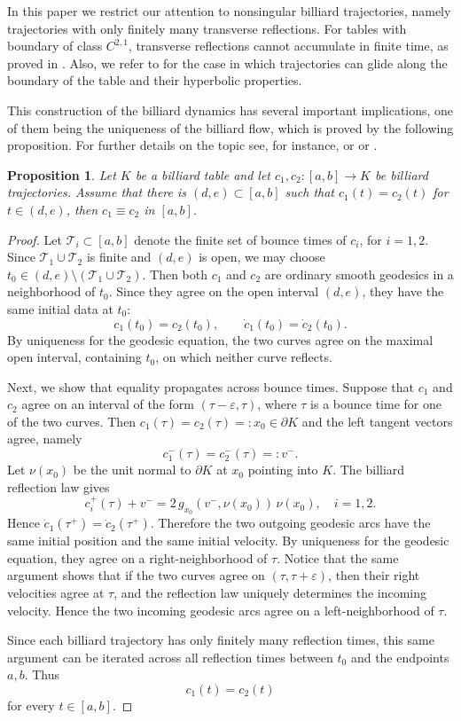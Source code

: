 \documentclass[11pt]{article}
\theoremstyle{definition}
\theoremstyle{remark}
\theoremstyle{plain}
\newtheorem{proposition}[definition]{Proposition}
\begin{document}
In this paper we restrict our attention to nonsingular billiard trajectories, namely trajectories with only finitely many transverse reflections. For tables with boundary of class $C^{2,1}$, transverse reflections cannot accumulate in finite time, as proved in \cite{Halpern}. Also, we refer to \cite{Kourganoff} for the case in which trajectories can glide along the boundary of the table and their hyperbolic properties.
 
This construction of the billiard dynamics has several important implications, one of them being the uniqueness of the billiard flow, which is proved by the following proposition. For further details on the topic see, for
instance, \cite{tabac} or \cite[Section 3]{khtab} or
\cite{FierobeKaloshinSorrentino}.

\begin{proposition}\label{prop:billiard_uniqueness}
  Let $K$ be a billiard table and let $c_1,c_2:[a,b]\to K$ be billiard trajectories. Assume that there is $(d,e)\subset [a,b]$ such that $c_1(t) = c_2(t)$ for $t\in (d,e)$, then $c_1\equiv c_2$ in $[a,b]$.
\end{proposition}

\begin{proof}
Let $\mathcal T_i\subset [a,b]$ denote the finite set of bounce times of $c_i$, for $i=1,2$. Since $\mathcal T_1\cup\mathcal T_2$ is finite and $(d,e)$ is open, we may choose $t_0\in (d,e)\setminus(\mathcal T_1\cup\mathcal T_2)$. Then both $c_1$ and $c_2$ are ordinary smooth geodesics in a neighborhood of
$t_0$. Since they agree on the open interval $(d,e)$, they have the same initial data at $t_0$:
$$c_1(t_0)=c_2(t_0), \qquad \dot c_1(t_0)=\dot c_2(t_0).$$
By uniqueness for the geodesic equation, the two curves agree on the maximal
open interval, containing $t_0$, on which neither curve reflects.

Next, we show that equality propagates across bounce times. Suppose that $c_1$ and $c_2$ agree on an interval of the form $(\tau-\varepsilon,\tau)$, where $\tau$ is a bounce time for one of the two curves. Then $c_1(\tau)=c_2(\tau)=:x_0\in \partial K$ and the left tangent vectors agree, namely
$$c_1^-(\tau)=c_2^-(\tau)=:v^-.$$
Let $\nu(x_0)$ be the unit normal to $\partial K$ at $x_0$ pointing into $K$. The billiard reflection law gives
$$c_i^+(\tau) + v^-= 2\,g_{x_0}(v^-,\nu(x_0))\,\nu(x_0), \quad i=1,2.$$
Hence $\dot c_1(\tau^+)=\dot c_2(\tau^+)$. Therefore the two outgoing geodesic arcs have the same initial position and the same initial velocity. By uniqueness for the geodesic equation, they agree on a right-neighborhood of $\tau$. Notice that the same argument shows that if the two curves agree on $(\tau,\tau+\varepsilon)$, then their right velocities agree at $\tau$, and the reflection law uniquely determines the incoming velocity. Hence the two incoming geodesic arcs agree on a left-neighborhood of $\tau$.

Since each billiard trajectory has only finitely many reflection times, this same argument can be iterated across all reflection times between $t_0$ and the endpoints $a,b$. Thus
$$c_1(t)=c_2(t)$$
for every $t\in [a,b]$.
\end{proof}
\end{document}
